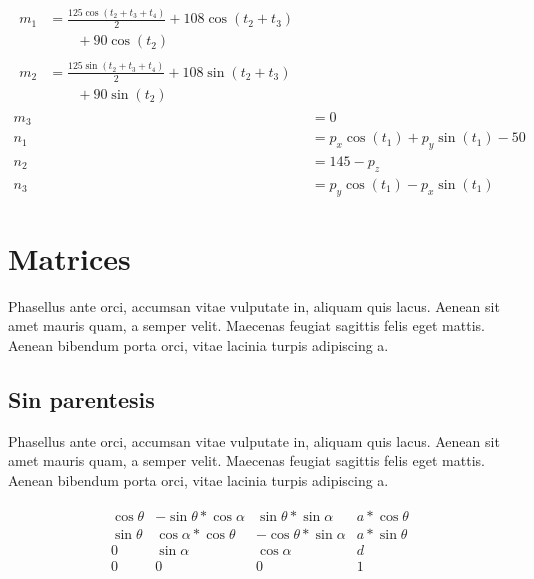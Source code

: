 \documentclass[colTwo]{NanouparIEEE}
\begin{document}
                \begin{align*}
                    \begin{split}
                    m_1 &= \frac{125\cos{(t_2 + t_3 + t_4)}}{2} + 108\cos{(t_2 + t_3)} \\ 
                    & \quad \quad + 90\cos{(t_2)}
                    \end{split} \\
                    \begin{split}
                    m_2 &= \frac{125 \sin{(t_2 + t_3 + t_4)}}{2} + 108\sin{(t_2 + t_3)} \\ 
                    & \quad \quad + 90\sin{(t_2)}
                    \end{split}\\
                    m_3 &= 0 \\
                    n_1 &= p_x \cos{(t_1)} + p_y\sin{(t_1)} - 50 \\
                    n_2 &= 145 - p_z\\
                    n_3 &= p_y \cos{(t_1)} - p_x \sin{(t_1)}  
                \end{align*}
            

    \section{Matrices}

        Phasellus ante orci, accumsan vitae vulputate in, aliquam quis lacus. Aenean sit amet mauris quam, a semper velit. Maecenas feugiat sagittis felis eget mattis. Aenean bibendum porta orci, vitae lacinia turpis adipiscing a. 

        \subsection{Sin parentesis}
            Phasellus ante orci, accumsan vitae vulputate in, aliquam quis lacus. Aenean sit amet mauris quam, a semper velit. Maecenas feugiat sagittis felis eget mattis. Aenean bibendum porta orci, vitae lacinia turpis adipiscing a. 
            
            \begin{align}
                \begin{array}{lccl}
                \cos{\theta} & -\sin \theta * \cos \alpha & \sin \theta * \sin \alpha & a * \cos \theta \\
                \sin \theta & \cos \alpha * \cos \theta & -\cos \theta * \sin \alpha & a * \sin \theta \\
                0 & \sin \alpha & \cos \alpha & d \\
                0 & 0 & 0 & 1
                \end{array}
            \end{align}
\end{document}
